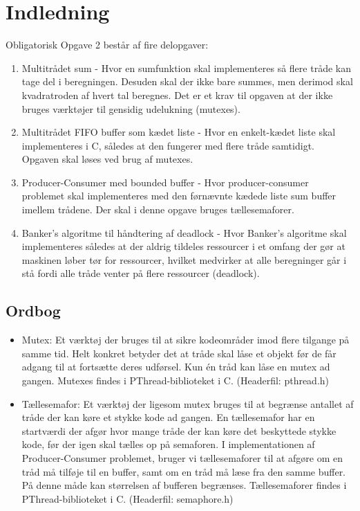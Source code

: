 \section{Indledning}
Obligatorisk Opgave 2 består af fire delopgaver:

\begin{enumerate}
	\item Multitrådet sum - Hvor en sumfunktion skal implementeres så flere tråde kan tage del i beregningen. Desuden skal der ikke bare summes, men derimod skal kvadratroden af hvert tal beregnes. Det er et krav til opgaven at der ikke bruges værktøjer til gensidig udelukning (mutexes).
	\item Multitrådet FIFO buffer som kædet liste - Hvor en enkelt-kædet liste skal implementeres i C, således at den fungerer med flere tråde samtidigt. Opgaven skal løses ved brug af mutexes.
	\item Producer-Consumer med bounded buffer - Hvor producer-consumer problemet skal implementeres med den førnævnte kædede liste sum buffer imellem trådene. Der skal i denne opgave bruges tællesemaforer.
	\item Banker's algoritme til håndtering af deadlock - Hvor Banker's algoritme skal implementeres således at der aldrig tildeles ressourcer i et omfang der gør at maskinen løber tør for ressourcer, hvilket medvirker at alle beregninger går i stå fordi alle tråde venter på flere ressourcer (deadlock). 
\end{enumerate}

\subsection{Ordbog}
\begin{itemize}
	\item Mutex: Et værktøj der bruges til at sikre kodeområder imod flere tilgange på samme tid. Helt konkret betyder det at tråde skal låse et objekt før de får adgang til at fortsætte deres udførsel. Kun én tråd kan låse en mutex ad gangen. Mutexes findes i PThread-biblioteket i C. (Headerfil: pthread.h)
	\item Tællesemafor: Et værktøj der ligesom mutex bruges til at begrænse antallet af tråde der kan køre et stykke kode ad gangen. En tællesemafor har en startværdi der afgør hvor mange tråde der kan køre det beskyttede stykke kode, før der igen skal tælles op på semaforen. I implementationen af Producer-Consumer problemet, bruger vi tællesemaforer til at afgøre om en tråd må tilføje til en buffer, samt om en tråd må læse fra den samme buffer. På denne måde kan størrelsen af bufferen begrænses. Tællesemaforer findes i PThread-biblioteket i C. (Headerfil: semaphore.h)
\end{itemize}
